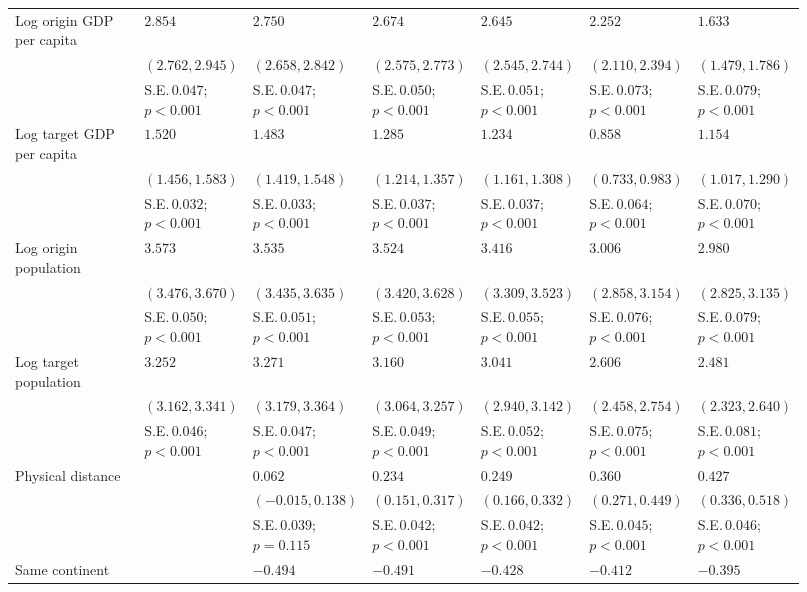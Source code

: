 {\begin{longtable}{p{0.2\linewidth}p{0.12\linewidth}p{0.12\linewidth}p{0.12\linewidth}p{0.12\linewidth}p{0.12\linewidth}p{0.12\linewidth}}
Log origin GDP per capita & $2.854$ & $2.750$ & $2.674$ & $2.645$ & $2.252$ & $1.633$\\ 
 & $(2.762, 2.945)$ & $(2.658, 2.842)$ & $(2.575, 2.773)$ & $(2.545, 2.744)$ & $(2.110, 2.394)$ & $(1.479, 1.786)$\\ 
 & S.E.\,$0.047$; ${p < 0.001}$ & S.E.\,$0.047$; ${p < 0.001}$ & S.E.\,$0.050$; ${p < 0.001}$ & S.E.\,$0.051$; ${p < 0.001}$ & S.E.\,$0.073$; ${p < 0.001}$ & S.E.\,$0.079$; ${p < 0.001}$\\ [0.8ex]  
Log target GDP per capita & $1.520$ & $1.483$ & $1.285$ & $1.234$ & $0.858$ & $1.154$\\ 
 & $(1.456, 1.583)$ & $(1.419, 1.548)$ & $(1.214, 1.357)$ & $(1.161, 1.308)$ & $(0.733, 0.983)$ & $(1.017, 1.290)$\\ 
 & S.E.\,$0.032$; ${p < 0.001}$ & S.E.\,$0.033$; ${p < 0.001}$ & S.E.\,$0.037$; ${p < 0.001}$ & S.E.\,$0.037$; ${p < 0.001}$ & S.E.\,$0.064$; ${p < 0.001}$ & S.E.\,$0.070$; ${p < 0.001}$\\ [0.8ex]  
Log origin population & $3.573$ & $3.535$ & $3.524$ & $3.416$ & $3.006$ & $2.980$\\ 
 & $(3.476, 3.670)$ & $(3.435, 3.635)$ & $(3.420, 3.628)$ & $(3.309, 3.523)$ & $(2.858, 3.154)$ & $(2.825, 3.135)$\\ 
 & S.E.\,$0.050$; ${p < 0.001}$ & S.E.\,$0.051$; ${p < 0.001}$ & S.E.\,$0.053$; ${p < 0.001}$ & S.E.\,$0.055$; ${p < 0.001}$ & S.E.\,$0.076$; ${p < 0.001}$ & S.E.\,$0.079$; ${p < 0.001}$\\ [0.8ex]  
Log target population & $3.252$ & $3.271$ & $3.160$ & $3.041$ & $2.606$ & $2.481$\\ 
 & $(3.162, 3.341)$ & $(3.179, 3.364)$ & $(3.064, 3.257)$ & $(2.940, 3.142)$ & $(2.458, 2.754)$ & $(2.323, 2.640)$\\ 
 & S.E.\,$0.046$; ${p < 0.001}$ & S.E.\,$0.047$; ${p < 0.001}$ & S.E.\,$0.049$; ${p < 0.001}$ & S.E.\,$0.052$; ${p < 0.001}$ & S.E.\,$0.075$; ${p < 0.001}$ & S.E.\,$0.081$; ${p < 0.001}$\\ [0.8ex]  
Physical distance &  & $0.062$ & $0.234$ & $0.249$ & $0.360$ & $0.427$\\ 
 &  & $(-0.015, 0.138)$ & $(0.151, 0.317)$ & $(0.166, 0.332)$ & $(0.271, 0.449)$ & $(0.336, 0.518)$\\ 
 &  & S.E.\,$0.039$; ${p = 0.115}$ & S.E.\,$0.042$; ${p < 0.001}$ & S.E.\,$0.042$; ${p < 0.001}$ & S.E.\,$0.045$; ${p < 0.001}$ & S.E.\,$0.046$; ${p < 0.001}$\\ [0.8ex]  
Same continent &  & $-0.494$ & $-0.491$ & $-0.428$ & $-0.412$ & $-0.395$\\ 

\end{longtable}}
